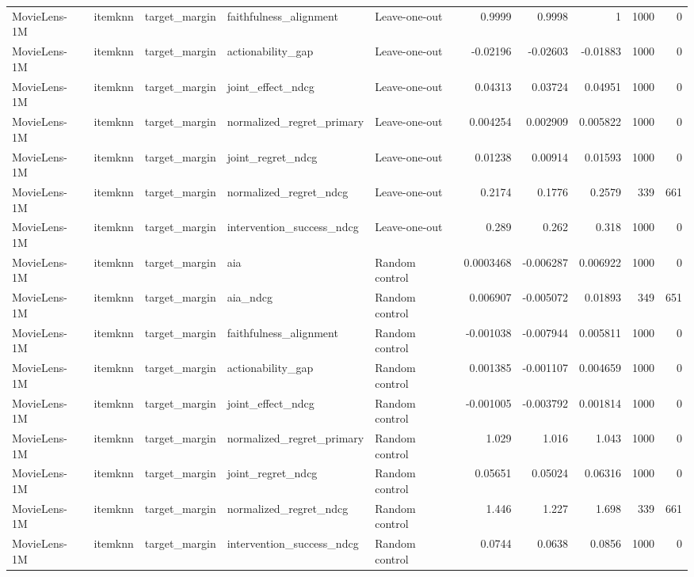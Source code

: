 \begin{table}[t]
\begin{tabular}{lllllrrrrr}
MovieLens-1M & itemknn & target\_margin & faithfulness\_alignment & Leave-one-out & 0.9999 & 0.9998 & 1 & 1000 & 0 \\
MovieLens-1M & itemknn & target\_margin & actionability\_gap & Leave-one-out & -0.02196 & -0.02603 & -0.01883 & 1000 & 0 \\
MovieLens-1M & itemknn & target\_margin & joint\_effect\_ndcg & Leave-one-out & 0.04313 & 0.03724 & 0.04951 & 1000 & 0 \\
MovieLens-1M & itemknn & target\_margin & normalized\_regret\_primary & Leave-one-out & 0.004254 & 0.002909 & 0.005822 & 1000 & 0 \\
MovieLens-1M & itemknn & target\_margin & joint\_regret\_ndcg & Leave-one-out & 0.01238 & 0.00914 & 0.01593 & 1000 & 0 \\
MovieLens-1M & itemknn & target\_margin & normalized\_regret\_ndcg & Leave-one-out & 0.2174 & 0.1776 & 0.2579 & 339 & 661 \\
MovieLens-1M & itemknn & target\_margin & intervention\_success\_ndcg & Leave-one-out & 0.289 & 0.262 & 0.318 & 1000 & 0 \\
MovieLens-1M & itemknn & target\_margin & aia & Random control & 0.0003468 & -0.006287 & 0.006922 & 1000 & 0 \\
MovieLens-1M & itemknn & target\_margin & aia\_ndcg & Random control & 0.006907 & -0.005072 & 0.01893 & 349 & 651 \\
MovieLens-1M & itemknn & target\_margin & faithfulness\_alignment & Random control & -0.001038 & -0.007944 & 0.005811 & 1000 & 0 \\
MovieLens-1M & itemknn & target\_margin & actionability\_gap & Random control & 0.001385 & -0.001107 & 0.004659 & 1000 & 0 \\
MovieLens-1M & itemknn & target\_margin & joint\_effect\_ndcg & Random control & -0.001005 & -0.003792 & 0.001814 & 1000 & 0 \\
MovieLens-1M & itemknn & target\_margin & normalized\_regret\_primary & Random control & 1.029 & 1.016 & 1.043 & 1000 & 0 \\
MovieLens-1M & itemknn & target\_margin & joint\_regret\_ndcg & Random control & 0.05651 & 0.05024 & 0.06316 & 1000 & 0 \\
MovieLens-1M & itemknn & target\_margin & normalized\_regret\_ndcg & Random control & 1.446 & 1.227 & 1.698 & 339 & 661 \\
MovieLens-1M & itemknn & target\_margin & intervention\_success\_ndcg & Random control & 0.0744 & 0.0638 & 0.0856 & 1000 & 0 \\

\end{tabular}
\end{table}
